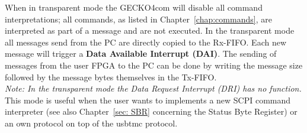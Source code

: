 When in transparent mode the {\sc GECKO4com} will disable all command
interpretations; all commands, as listed in Chapter~\ref{chap:commands}, are
interpreted as part of a message and are not executed. In the transparent mode
all messages send from the PC are directly copied to the Rx-FIFO. Each new
message will trigger a \textbf{Data Available Interrupt (DAI)}. The sending of
messages from the user FPGA to the PC can be done by writing the message size
followed by the message bytes themselves in the Tx-FIFO.\\
\textit{Note: In the transparent mode the Data Request Interrupt (DRI) has no
function.\note}\\

This mode is useful when the user wants to implements a new SCPI command
interpreter (see also Chapter~\ref{sec: SBR} concerning the Status Byte
Register) or an own protocol on top of the {\sc usbtmc} protocol.
